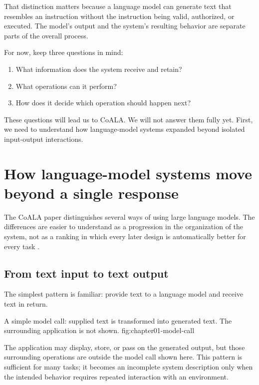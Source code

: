 That distinction matters because a language model can generate text that resembles an instruction without the instruction being valid, authorized, or executed. The model's output and the system's resulting behavior are separate parts of the overall process.

For now, keep three questions in mind:

\begin{enumerate}
\def\labelenumi{\arabic{enumi}.}
\tightlist
\item
  What information does the system receive and retain?
\item
  What operations can it perform?
\item
  How does it decide which operation should happen next?
\end{enumerate}

These questions will lead us to CoALA. We will not answer them fully yet. First, we need to understand how language-model systems expanded beyond isolated input-output interactions.

\section{How language-model systems move beyond a single response}\label{how-language-model-systems-move-beyond-a-single-response}

The CoALA paper distinguishes several ways of using large language models. The differences are easier to understand as a progression in the organization of the system, not as a ranking in which every later design is automatically better for every task .

\subsection{From text input to text output}\label{from-text-input-to-text-output}

The simplest pattern is familiar: provide text to a language model and receive text in return.

  {A simple model call: supplied text is transformed into generated text. The surrounding application is not shown.}
  {fig:chapter01-model-call}

The application may display, store, or pass on the generated output, but those surrounding operations are outside the model call shown here. This pattern is sufficient for many tasks; it becomes an incomplete system description only when the intended behavior requires repeated interaction with an environment.

